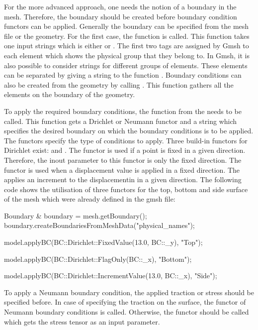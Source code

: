 For the more advanced approach, one needs the notion of a boundary in the mesh. Therefore, the boundary should be created before boundary condition functors can be applied. Generally the boundary can be specified from the mesh file or the geometry. 
For the first case, the function  is called. This function takes one input strings which is either  or . The first two tags are assigned by Gmsh to each element which shows the physical group that they belong to. In Gmsh, it is also possible to consider strings for different groups of elements. These elements can be separated by giving a string  to the function . 
Boundary conditions can also be created from the geometry by calling . This function gathers all the elements on the boundary of the geometry.

To apply the required boundary conditions, the function  from the   needs to be called. This function gets a Drichlet or Neumann functor and a string which specifies the desired boundary on which the boundary conditions is to be applied. The functors specify the type of conditions to apply. Three build-in functors for Dirichlet exist:  and . The functor  is used if a point is fixed in a given direction. Therefore, the inout parameter to this functor is only the fixed direction. The  functor is used when a displacement value is applied in a fixed direction. The  applies an increment to the displacementin in a given direction. The following code shows the utilisation of three functors for the top, bottom and side surface of the mesh which were already defined in the gmsh file:

\begin{cpp}
 
 Boundary & boundary = mesh.getBoundary();
 boundary.createBoundariesFromMeshData("physical_names");

  model.applyBC(BC::Dirichlet::FixedValue(13.0, BC::_y), "Top");
  
  model.applyBC(BC::Dirichlet::FlagOnly(BC::_x), "Bottom");
  
  model.applyBC(BC::Dirichlet::IncrementValue(13.0, BC::_x), "Side");

\end{cpp}

To apply a Neumann boundary condition, the applied traction or stress should be specified before. In case of specifying the traction on the surface, the functor  of Neumann boundary conditions is called. Otherwise, the functor  should be called which gets the stress tensor as an input parameter.

